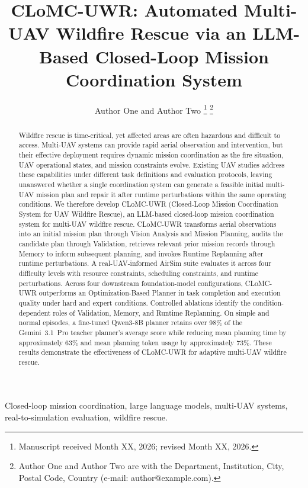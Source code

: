 \documentclass[journal,twoside,web]{ieeecolor}
\begin{document}
\title{CLoMC-UWR: Automated Multi-UAV Wildfire Rescue via an LLM-Based Closed-Loop Mission Coordination System}

\author{Author One and Author Two%
\thanks{Manuscript received Month XX, 2026; revised Month XX, 2026.}%
\thanks{Author One and Author Two are with the Department, Institution, City,
Postal Code, Country (e-mail: author@example.com).}}

\maketitle

\begin{abstract}
Wildfire rescue is time-critical, yet affected areas are often hazardous and
difficult to access. Multi-UAV systems can provide rapid aerial observation
and intervention, but their effective deployment requires dynamic mission
coordination as the fire situation, UAV operational states, and mission
constraints evolve.
Existing UAV studies address these capabilities under different task
definitions and evaluation protocols, leaving unanswered whether a single
coordination system can generate a feasible initial multi-UAV mission plan and repair
it after runtime perturbations within the same operating conditions. We
therefore develop CLoMC-UWR (Closed-Loop Mission Coordination System for UAV
Wildfire Rescue), an LLM-based closed-loop mission
coordination system for multi-UAV wildfire rescue. CLoMC-UWR transforms aerial
observations into an initial mission plan through Vision Analysis and Mission Planning,
audits the candidate plan through Validation, retrieves relevant prior mission records
through Memory to inform subsequent planning, and invokes Runtime Replanning
after runtime perturbations. A
real-UAV-informed AirSim suite evaluates it across four difficulty levels with
resource constraints, scheduling constraints, and runtime perturbations. Across
four downstream foundation-model configurations, CLoMC-UWR outperforms an
Optimization-Based Planner in task completion and execution quality under hard
and expert conditions. Controlled ablations identify the condition-dependent
roles of Validation, Memory, and Runtime Replanning. On simple and normal episodes, a
fine-tuned Qwen3-8B planner retains over 98\% of the Gemini~3.1~Pro teacher
planner's average score while reducing mean planning time by approximately
63\% and mean planning token usage by approximately 73\%. These results
demonstrate the effectiveness of CLoMC-UWR for adaptive multi-UAV wildfire
rescue.
\end{abstract}

\begin{IEEEkeywords}
Closed-loop mission coordination, large language models, multi-UAV systems,
real-to-simulation evaluation, wildfire rescue.
\end{IEEEkeywords}









\end{document}
